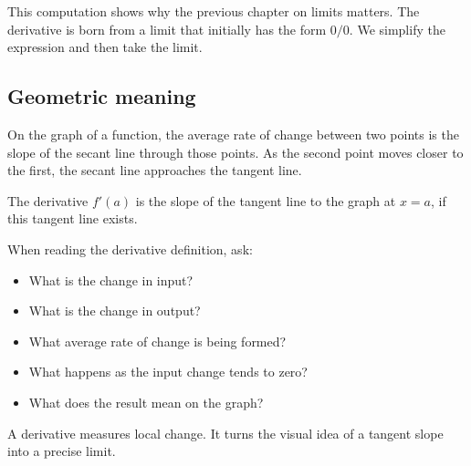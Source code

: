 This computation shows why the previous chapter on limits matters. The derivative is born from a limit that initially has the form \(0/0\). We simplify the expression and then take the limit.

\subsection*{Geometric meaning}

On the graph of a function, the average rate of change between two points is the slope of the secant line through those points. As the second point moves closer to the first, the secant line approaches the tangent line.

The derivative \(f'(a)\) is the slope of the tangent line to the graph at \(x=a\), if this tangent line exists.

\begin{summarybox}
When reading the derivative definition, ask:
\begin{itemize}
\item What is the change in input?
\item What is the change in output?
\item What average rate of change is being formed?
\item What happens as the input change tends to zero?
\item What does the result mean on the graph?
\end{itemize}
\end{summarybox}

A derivative measures local change. It turns the visual idea of a tangent slope into a precise limit.